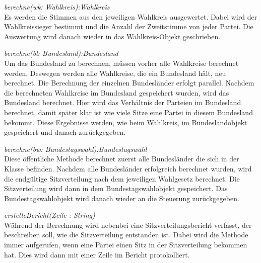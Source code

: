 \documentclass[12pt,a4paper,titlepage]{article}
\newcommand{\mymo}{\fontfamily{pcr}\selectfont \textit}
\begin{document}
\begin{description}

\item {\mymo{berechne(wk: Wahlkreis):Wahlkreis}} \\
Es werden die Stimmen aus den jeweiligen Wahlkreis ausgewertet. Dabei wird der Wahlkreissieger bestimmt und die Anzahl der Zweitstimme von jeder Partei. Die Auswertung wird danach wieder in das Wahlkreis-Objekt geschrieben.
\item {\mymo{berechne(bl: Bundesland):Bundesland}} \\
Um das Bundesland zu berechnen, müssen vorher alle Wahlkreise berechnet werden. Deswegen werden alle Wahlkreise, die ein Bundesland hält, neu berechnet. Die Berechnung der einzelnen Bundesländer erfolgt parallel. Nachdem die berechneten Wahlkreise im Bundesland gespeichert wurden, wird das Bundesland berechnet. Hier wird das Verhältnis der Parteien im Bundesland berechnet, damit später klar ist wie viele Sitze eine Partei in diesem Bundesland bekommt. Diese Ergebnisse werden, wie beim Wahlkreis, im Bundeslandobjekt gespeichert und danach zurückgegeben. 
\item {\mymo{berechne(bw: Bundestagswahl):Bundestagswahl}} \\
Diese öffentliche Methode berechnet zuerst alle Bundesländer die sich in der Klasse befinden. Nachdem alle Bundesländer erfolgreich berechnet wurden, wird die endgültige Sitzverteilung nach dem jeweiligen Wahlgesetz berechnet. Die Sitzverteilung wird dann in dem Bundestagswahlobjekt gespeichert. Das Bundestagswahlobjekt wird danach wieder an die Steuerung zurückgegeben.
\item {\mymo{erstelleBericht(Zeile : String)}} \\
Während der Berechnung wird nebenbei eine Sitzverteilungsbericht verfasst, der beschreiben soll, wie die Sitzverteilung entstanden ist. Dabei wird die Methode immer aufgerufen, wenn eine Partei einen Sitz in der Sitzverteilung bekommen hat. Dies wird dann mit einer Zeile im Bericht protokolliert.
\end{description} 

\newpage
\end{document}
